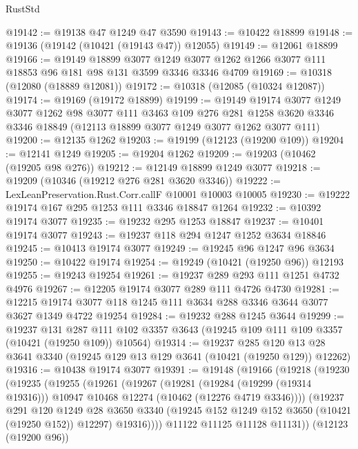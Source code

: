 \begin{lexlean}{RustStd}
\begin{coremodule}
@19142 := @19138 @47 @1249 @47 @3590
@19143 := @10422 @18899
@19148 := @19136 (@19142 (@10421 (@19143 @47)) @12055)
@19149 := @12061 @18899
@19166 := @19149
    @18899
    @3077
    @1249
    @3077
    @1262
    @1266
    @3077
    @111
    @18853
    @96
    @181
    @98
    @131
    @3599
    @3346
    @3346
    @4709
@19169 := @10318 (@12080 (@18889 @12081))
@19172 := @10318 (@12085 (@10324 @12087))
@19174 := @19169 (@19172 @18899)
@19199 := @19149
    @19174
    @3077
    @1249
    @3077
    @1262
    @98
    @3077
    @111
    @3463
    @109
    @276
    @281
    @1258
    @3620
    @3346
    @3346
    @18849
    (@12113 @18899 @3077 @1249 @3077 @1262 @3077 @111)
@19200 := @12135 @1262
@19203 := @19199 (@12123 (@19200 @109))
@19204 := @12141 @1249
@19205 := @19204 @1262
@19209 := @19203 (@10462 (@19205 @98 @276))
@19212 := @12149 @18899 @1249 @3077
@19218 := @19209 (@10346 (@19212 @276 @281 @3620 @3346))
@19222 := LexLeanPreservation.Rust.Corr.callF @10001 @10003 @10005
@19230 := @19222 @19174 @167 @295 @1253 @111 @3346 @18847 @1264
@19232 := @10392 @19174 @3077
@19235 := @19232 @295 @1253 @18847
@19237 := @10401 @19174 @3077
@19243 := @19237 @118 @294 @1247 @1252 @3634 @18846
@19245 := @10413 @19174 @3077
@19249 := @19245 @96 @1247 @96 @3634
@19250 := @10422 @19174
@19254 := @19249 (@10421 (@19250 @96)) @12193
@19255 := @19243 @19254
@19261 := @19237 @289 @293 @111 @1251 @4732 @4976
@19267 := @12205 @19174 @3077 @289 @111 @4726 @4730
@19281 := @12215 @19174 @3077 @118 @1245 @111 @3634 @288 @3346 @3644 @3077 @3627 @1349 @4722 @19254
@19284 := @19232 @288 @1245 @3644
@19299 := @19237
    @131
    @287
    @111
    @102
    @3357
    @3643
    (@19245 @109 @111 @109 @3357 (@10421 (@19250 @109)) @10564)
@19314 := @19237
    @285
    @120
    @13
    @28
    @3641
    @3340
    (@19245 @129 @13 @129 @3641 (@10421 (@19250 @129)) @12262)
@19316 := @10438 @19174 @3077
@19391 := @19148
    (@19166
      (@19218
        (@19230
          (@19235
            (@19255
              (@19261
                (@19267
                  (@19281
                    (@19284 (@19299 (@19314 @19316)))
                    @10947
                    @10468
                    @12274
                    (@10462 (@12276 @4719 @3346))))
                (@19237
                  @291
                  @120
                  @1249
                  @28
                  @3650
                  @3340
                  (@19245 @152 @1249 @152 @3650 (@10421 (@19250 @152)) @12297)
                  @19316))))
          @11122
          @11125
          @11128
          @11131))
      (@12123 (@19200 @96))

\end{coremodule}
\end{lexlean}
